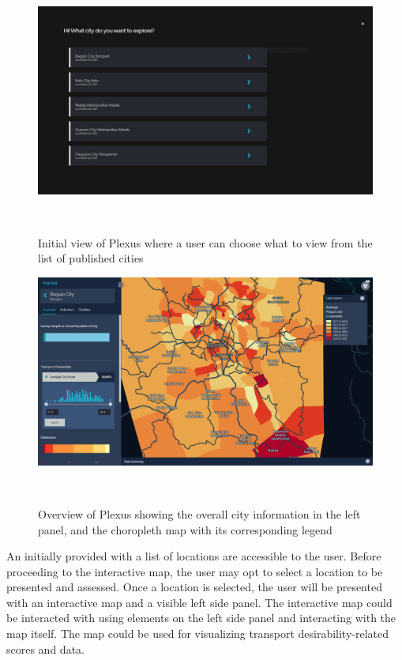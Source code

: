 \documentclass{sigchi}
\begin{document}
\begin{figure}
\centering
  \includegraphics[width=0.9\columnwidth]{figures/kepler1.PNG}
  \caption{Initial view of Plexus where a user can choose what to view from the list of published cities }~\label{fig:KeplerCityList}
\end{figure}

\begin{figure}
\centering
  \includegraphics[width=0.9\columnwidth]{figures/overview.PNG}
  \caption{Overview of Plexus showing the overall city information in the left panel, and the choropleth map with its corresponding legend }~\label{fig:KeplerInitialView}
\end{figure}

An initially provided with a list of locations are accessible to the user. Before proceeding to the interactive map, the user may opt to select a location to be presented and assessed. Once a location is selected, the user will be presented with an interactive map and a visible left side panel. The interactive map could be interacted with using elements on the left side panel and interacting with the map itself. The map could be used for visualizing transport desirability-related scores and data.
\end{document}
